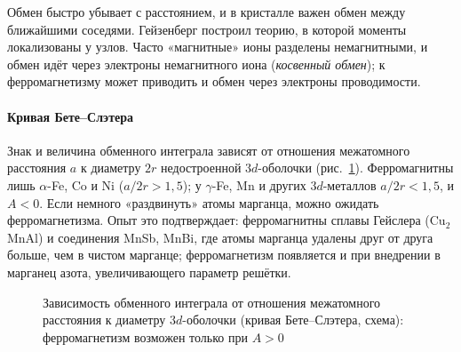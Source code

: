 Обмен быстро убывает с расстоянием, и в кристалле важен обмен между
ближайшими соседями. Гейзенберг построил теорию, в которой моменты
локализованы у узлов. Часто «магнитные» ионы разделены немагнитными, и
обмен идёт через электроны немагнитного иона (\emph{косвенный обмен});
к ферромагнетизму может приводить и обмен через электроны
проводимости.

\paragraph{Кривая Бете--Слэтера}
Знак и величина обменного интеграла зависят от отношения межатомного
расстояния $a$ к диаметру $2r$ недостроенной $3d$-оболочки
(рис.~\ref{fig:bethe}). Ферромагнитны лишь $\alpha$-Fe, Co и Ni ($a/2r>1{,}5$);
у $\gamma$-Fe, Mn и других $3d$-металлов $a/2r<1{,}5$, и $A<0$. Если
немного «раздвинуть» атомы марганца, можно ожидать ферромагнетизма. Опыт
это подтверждает: ферромагнитны сплавы Гейслера (Cu$_2$MnAl) и соединения
MnSb, MnBi, где атомы марганца удалены друг от друга больше, чем в чистом
марганце; ферромагнетизм появляется и при внедрении в марганец азота,
увеличивающего параметр решётки.

\begin{figure}[ht]
\centering
{}
\caption{Зависимость обменного интеграла от отношения межатомного
расстояния к диаметру $3d$-оболочки (кривая Бете--Слэтера, схема):
ферромагнетизм возможен только при $A>0$}
\label{fig:bethe}
\end{figure}

